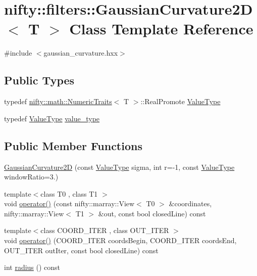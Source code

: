 \hypertarget{classnifty_1_1filters_1_1GaussianCurvature2D}{}\section{nifty\+:\+:filters\+:\+:Gaussian\+Curvature2\+D$<$ T $>$ Class Template Reference}
\label{classnifty_1_1filters_1_1GaussianCurvature2D}


{\ttfamily \#include $<$gaussian\+\_\+curvature.\+hxx$>$}

\subsection*{Public Types}
\begin{DoxyCompactItemize}
\item 
typedef \hyperlink{structnifty_1_1math_1_1NumericTraits}{nifty\+::math\+::\+Numeric\+Traits}$<$ T $>$\+::Real\+Promote \hyperlink{classnifty_1_1filters_1_1GaussianCurvature2D_af2739080c97506f5e72ebd4e69652311}{Value\+Type}
\item 
typedef \hyperlink{classnifty_1_1filters_1_1GaussianCurvature2D_af2739080c97506f5e72ebd4e69652311}{Value\+Type} \hyperlink{classnifty_1_1filters_1_1GaussianCurvature2D_affdbbda626530a7cd63878ca62f3682b}{value\+\_\+type}
\end{DoxyCompactItemize}
\subsection*{Public Member Functions}
\begin{DoxyCompactItemize}
\item 
\hyperlink{classnifty_1_1filters_1_1GaussianCurvature2D_a7405c5ba396d45a1f3e68db31835149e}{Gaussian\+Curvature2\+D} (const \hyperlink{classnifty_1_1filters_1_1GaussianCurvature2D_af2739080c97506f5e72ebd4e69652311}{Value\+Type} sigma, int r=-\/1, const \hyperlink{classnifty_1_1filters_1_1GaussianCurvature2D_af2739080c97506f5e72ebd4e69652311}{Value\+Type} window\+Ratio=3.)
\item 
{\footnotesize template$<$class T0 , class T1 $>$ }\\void \hyperlink{classnifty_1_1filters_1_1GaussianCurvature2D_a1d72ae55d7c0621a3fcdb869c6e7134a}{operator()} (const nifty\+::marray\+::\+View$<$ T0 $>$ \&coordinates, nifty\+::marray\+::\+View$<$ T1 $>$ \&out, const bool closed\+Line) const 
\item 
{\footnotesize template$<$class C\+O\+O\+R\+D\+\_\+\+I\+T\+E\+R , class O\+U\+T\+\_\+\+I\+T\+E\+R $>$ }\\void \hyperlink{classnifty_1_1filters_1_1GaussianCurvature2D_a65b9f3755e0a0ddb11867cd40aa048a6}{operator()} (C\+O\+O\+R\+D\+\_\+\+I\+T\+E\+R coords\+Begin, C\+O\+O\+R\+D\+\_\+\+I\+T\+E\+R coords\+End, O\+U\+T\+\_\+\+I\+T\+E\+R out\+Iter, const bool closed\+Line) const 
\item 
int \hyperlink{classnifty_1_1filters_1_1GaussianCurvature2D_a23a814f0b1b488d27cbdca14874f396d}{radius} () const 
\end{DoxyCompactItemize}


